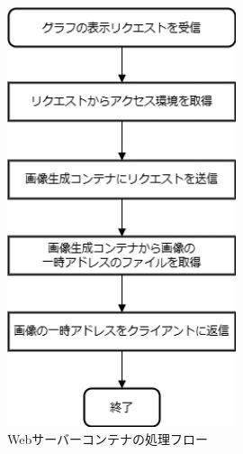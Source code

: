 \begin{figure}[htbp]
    \centering
    \includegraphics[width=0.6\textwidth]{fig/web_flow.png}
    \caption{Webサーバーコンテナの処理フロー}
    \label{fig:web_flow}
\end{figure}
\FloatBarrier

